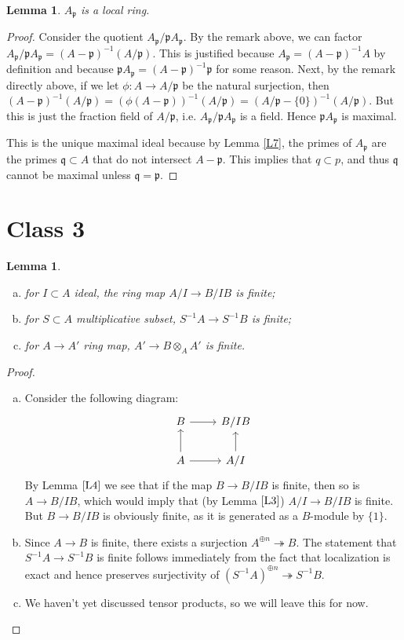 \documentclass{article}
\newcommand{\fr}{\mathfrak}
\theoremstyle{plain}
\newtheorem{lem}[thm]{Lemma}
\theoremstyle{definition}
\theoremstyle{remark}
\begin{document}
\begin{lem}
\label{L9}
$A_{\fr{p}}$ is a local ring.
\end{lem}
\begin{proof}
Consider the quotient $A_\fr p/\fr pA_\fr p$.  By the remark above, we 
can factor $A_{\fr{p}} / \fr{p}A_{\fr{p}} = (A - \fr{p})^{-1} (A/\fr{p})$. This is justified because $A_\fr p=(A-\fr p)^{-1}A$ by definition and because $\fr pA_\fr p=(A-\fr p)^{-1}\fr p$ for some reason. Next, by the remark directly above, if we let $\phi:A\to A/\fr p$ be the natural surjection, then $(A-\fr p)^{-1}(A/\fr p)=(\phi(A-\fr p))^{-1}(A/\fr p)=(A/\fr p-\{0\})^{-1}(A/\fr p)$. But this is just the fraction field of $A/\fr p$, i.e. $A_\fr p/\fr pA_\fr p$ is a field. Hence $\fr pA_\fr p$ is maximal.

This is the unique maximal ideal because by Lemma \ref{L7}, the primes of $A_{\fr p}$ are the primes $\fr{q}\subset A$ that do not intersect $A-\fr{p}$. This implies that $q\subset p$, and thus $\fr q$ cannot be maximal unless $\fr q = \fr p$.
\end{proof}




\section*{Class 3}

\begin{lem}
\label{L10}
\begin{enumerate}[(a)]
Let $A \overset{\phi}{\to} B$ be a finite ring map. Then
\item for $I \subset A$ ideal, the ring map $A/I \to B/IB$ is finite;
\item for $S\subset A$ multiplicative subset, $S^{-1}A \to S^{-1}B$ is finite;
\item for $A\to A'$ ring map, $A' \to B \otimes_A A'$ is finite.
\end{enumerate}
\end{lem}
\begin{proof}
\begin{enumerate}[(a)]
\item Consider the following diagram:
\[
\begin{tikzcd}
B\arrow{r} & B/IB\\
A\arrow{u}\arrow{r} & A/I\arrow{u}
\end{tikzcd}
\]
By Lemma $\ref{L4}$ we see that if the map $B\to B/IB$ is finite, then so is $A\to B/IB$, which would imply that (by Lemma $\ref{L3}$) $A/I\to B/IB$ is finite. But $B\to B/IB$ is obviously finite, as it is generated as a $B$-module by $\{1\}$.
\item Since $A\to B$ is finite, there exists a surjection $A^{\oplus n}\twoheadrightarrow B$. The statement that $S^{-1}A\to S^{-1}B$ is finite follows immediately from the fact that localization is exact and hence preserves surjectivity of $(S^{-1}A)^{\oplus n}\twoheadrightarrow S^{-1}B$.
\item We haven't yet discussed tensor products, so we will leave this for now.
\end{enumerate}
\end{proof}
\end{document}
